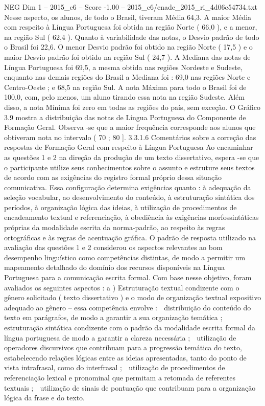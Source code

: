 \begin{textsample}{NEG Dim 1 – 2015\_c6 – Score -1.00 – 2015\_c6/enade\_2015\_ri\_4d06c54734.txt}
Nesse aspecto, os alunos, de todo o Brasil, tiveram Média 64,3.
A maior Média com respeito à Língua Portuguesa foi obtida na região Norte ( 66,0 ), e a menor, na região Sul ( 62,4 ).
Quanto à variabilidade das notas, o Desvio padrão de todo o Brasil foi 22,6.
O menor Desvio padrão foi obtido na região Norte ( 17,5 ) e o maior Desvio padrão foi obtido na região Sul ( 24,7 ).
A Mediana das notas de Língua Portuguesa foi 69,5, a mesma obtida nas regiões Nordeste e Sudeste, enquanto nas demais regiões do Brasil a Mediana foi : 69,0 nas regiões Norte e Centro-Oeste ; e 68,5 na região Sul.
A nota Máxima para todo o Brasil foi de 100,0, com, pelo menos, um aluno tirando essa nota na região Sudeste.
Além disso, a nota Mínima foi zero em todas as regiões do país, sem exceção.
O Gráfico 3.9 mostra a distribuição das notas de Língua Portuguesa do Componente de Formação Geral.
Observa -se que a maior frequência corresponde aos alunos que obtiveram nota no intervalo ( 70 ; 80 ]. 3.3.1.6 Comentários sobre a correção das respostas de Formação Geral com respeito à Língua Portuguesa Ao encaminhar as questões 1 e 2 na direção da produção de um texto dissertativo, espera -se que o participante utilize seus conhecimentos sobre o assunto e estruture seus textos de acordo com as exigências do registro formal próprio dessa situação comunicativa.
Essa configuração determina exigências quanto : à adequação da seleção vocabular, ao desenvolvimento do conteúdo, à estruturação sintática dos períodos, à organização lógica das ideias, à utilização de procedimentos de encadeamento textual e referenciação, à obediência às exigências morfossintáticas próprias da modalidade escrita da norma-padrão, ao respeito às regras ortográficas e às regras de acentuação gráfica.
O padrão de resposta utilizado na avaliação das questões 1 e 2 considerou os aspectos relevantes ao bom desempenho linguístico como competências distintas, de modo a permitir um mapeamento detalhado do domínio dos recursos disponíveis na Língua Portuguesa para a comunicação escrita formal.
Com base nesse objetivo, foram avaliados os seguintes aspectos : a ) Estruturação textual condizente com o gênero solicitado ( texto dissertativo ) e o modo de organização textual expositivo adequado ao gênero – essa competência envolve :  distribuição do conteúdo do texto em parágrafos, de modo a garantir a sua organização temática ;  estruturação sintática condizente com o padrão da modalidade escrita formal da língua portuguesa de modo a garantir a clareza necessária ;  utilização de operadores discursivos que contribuam para a progressão temática do texto, estabelecendo relações lógicas entre as ideias apresentadas, tanto do ponto de vista intrafrasal, como do interfrasal ;  utilização de procedimentos de referenciação lexical e pronominal que permitam a retomada de referentes textuais ;  utilização de sinais de pontuação que contribuam para a organização lógica da frase e do texto.

\end{textsample}
